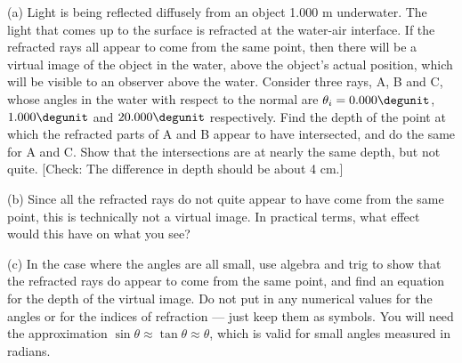(a) Light is being reflected diffusely from an object
1.000 m underwater. The light that comes up to the
surface is refracted at the water-air interface. If the
refracted rays all appear to come from the same point, then
there will be a virtual image of the object in the water,
above the object's actual position, which will be visible to
an observer above the water. Consider three rays, A, B
and C, whose angles in the water with respect to the
normal are $\theta_i=0.000\degunit$, $1.000\degunit$ and
$20.000\degunit$ respectively. Find the depth of the point at
which the refracted parts of A and B appear to have
intersected, and do the same for A and C. Show that the
intersections are at nearly the same depth, but not quite.
[Check: The difference in depth should be about 4 cm.]

(b) Since all the refracted rays do not quite appear to have
come from the same point, this is technically not a virtual
image. In practical terms, what effect would this
have on what you see?

(c) In the case where the angles are all small, use algebra
and trig to show that the refracted rays do appear to come
from the same point, and find an equation for the depth of
the virtual image. Do not put in any numerical values for
the angles or for the indices of refraction --- just keep
them as symbols. You will need the approximation $\sin\theta\approx \tan\theta\approx \theta$, which is
valid for small angles measured in radians.

